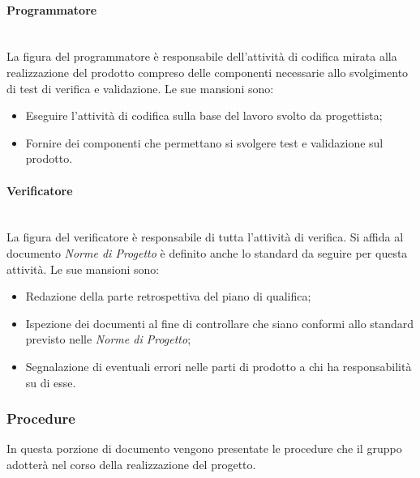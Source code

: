 			\paragraph{Programmatore}\mbox{}\\ [1mm]
				La figura del programmatore è responsabile dell'attività di codifica mirata alla realizzazione del prodotto compreso delle componenti necessarie allo svolgimento di test di verifica e validazione.
				Le sue mansioni sono:
				\begin{itemize}
					\item Eseguire l'attività di codifica sulla base del lavoro svolto da progettista;
					\item Fornire dei componenti che permettano si svolgere test e validazione sul prodotto.
				\end{itemize}
			\paragraph{Verificatore}\mbox{}\\ [1mm]
				La figura del verificatore è responsabile di tutta l'attività di verifica.
				Si affida al documento \textit{Norme di Progetto} è definito anche lo standard da seguire per questa attività.
				Le sue mansioni sono:
				\begin{itemize}
					\item Redazione della parte retrospettiva del piano di qualifica;
					\item Ispezione dei documenti al fine di controllare che siano conformi allo standard previsto nelle \textit{Norme di Progetto};
					\item Segnalazione di eventuali errori nelle parti di prodotto a chi ha responsabilità su di esse.
				\end{itemize}
		\subsubsection{Procedure}
			In questa porzione di documento vengono presentate le procedure che il gruppo adotterà nel corso della realizzazione del progetto.
